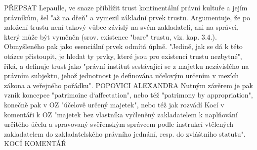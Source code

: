 \documentclass{article}
\begin{document}
PŘEPSAT
Lepaulle, ve snaze přiblížit trust kontinentální právní kultuře a jejím právníkům, šel "až na dřeň" a vymezil základní prvek trustu. Argumentuje, že po založení trustu není takový vůbec závislý na svém zakladateli, ani na správci, který může být vyměněn (srov. existence "bare" trustu, viz. kap. 3.4.). Obmyšleného pak jako esenciální prvek odmítá úplně. "Jedině, jak se dá k této otázce přistoupit, je hledat ty prvky, které jsou pro existenci trustu nezbytné", říká, a definuje trust jako "právní institut sestávající se z majetku nezávislého na právním subjektu, jehož jednotnost je definována učelovým určením v mezích zákona a veřejného pořádku". POPOVICI ALEXANDRA Nutným závěrem je pak vznik koncepce "patrimoine d`affectation", nebo též "patrimony by appropriation", konečně pak v OZ "účelově určený majetek", nebo též jak rozvádí Kocí v komentáři k OZ "majetek bez vlastníka vyčleněný zakladatelem k naplňování určitého účelu a spravovaný svěřenským správcem podle instrukcí vtělených zakladatelem do zakladatelského právního jednání, resp. do zvláštního statutu". KOCÍ KOMENTÁŘ 







\end{document}
